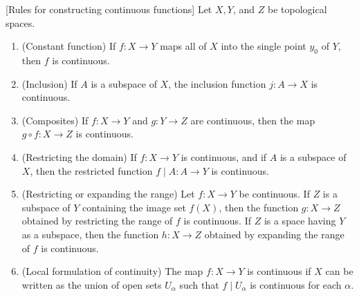 \begin{theorem}
\label{thm:\thetheorem}[Rules for constructing continuous functions]
 Let \(X,Y\), and \(Z\) be topological spaces.

 \begin{enumerate}[itemsep=0.2em, parsep=0pt, topsep=0pt, partopsep=0pt, leftmargin=*, label=(\alph*), align=left]
 \item (Constant function) If \(f : X \rightarrow Y\) maps all of \(X\) into the single point \(y_{0}\) of \(Y\), then \(f\) is continuous.

 \item (Inclusion) If \(A\) is a subspace of \(X\), the inclusion function \(j : A \rightarrow X\) is continuous.

 \item (Composites) If \(f : X \rightarrow Y\) and \(g : Y \rightarrow Z\) are continuous, then the map \(g \circ f : X \rightarrow Z\) is continuous.

 \item (Restricting the domain) If \(f : X \rightarrow Y\) is continuous, and if \(A\) is a subspace of \(X\), then the restricted function \(f \mid A : A \rightarrow Y\) is continuous.

 \item (Restricting or expanding the range) Let \(f : X \rightarrow Y\) be continuous. If \(Z\) is a subspace of \(Y\) containing the image set \(f( X)\), then the function \(g : X \rightarrow Z\) obtained by restricting the range of \(f\) is continuous. If \(Z\) is a space having \(Y\) as a subspace, then the function \(h : X \rightarrow Z\) obtained by expanding the range of \(f\) is continuous.

 \item (Local formulation of continuity) The map \(f : X \rightarrow Y\) is continuous if \(X\) can be written as the union of open sets \(U_{\alpha }\) such that \(f \mid {U}_{\alpha }\) is continuous for each \(\alpha\).
 \end{enumerate}
\end{theorem}

